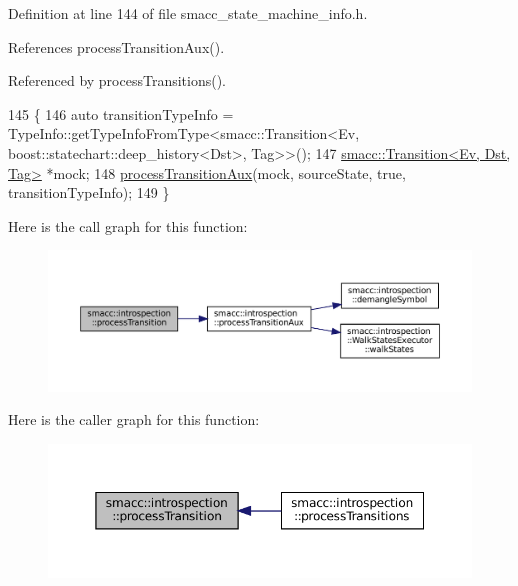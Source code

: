 Definition at line 144 of file smacc\+\_\+state\+\_\+machine\+\_\+info.\+h.



References process\+Transition\+Aux().



Referenced by process\+Transitions().


\begin{DoxyCode}
145 \{
146     \textcolor{keyword}{auto} transitionTypeInfo = TypeInfo::getTypeInfoFromType<smacc::Transition<Ev,
       boost::statechart::deep\_history<Dst>, Tag>>();
147     \hyperlink{classsmacc_1_1Transition}{smacc::Transition<Ev, Dst, Tag>} *mock;
148     \hyperlink{namespacesmacc_1_1introspection_a208cd71dc5579090d40b3d3b9efb28a6}{processTransitionAux}(mock, sourceState, \textcolor{keyword}{true}, transitionTypeInfo);
149 \}
\end{DoxyCode}
Here is the call graph for this function\+:
\nopagebreak
\begin{figure}[H]
\begin{center}
\leavevmode
\includegraphics[width=350pt]{namespacesmacc_1_1introspection_a91f7cda900e7002c923494db5afce63f_cgraph}
\end{center}
\end{figure}
Here is the caller graph for this function\+:
\nopagebreak
\begin{figure}[H]
\begin{center}
\leavevmode
\includegraphics[width=350pt]{namespacesmacc_1_1introspection_a91f7cda900e7002c923494db5afce63f_icgraph}
\end{center}
\end{figure}
\mbox{\label{namespacesmacc_1_1introspection_a4f5403936b7b501da0c6fa9f067e09fd}} 
